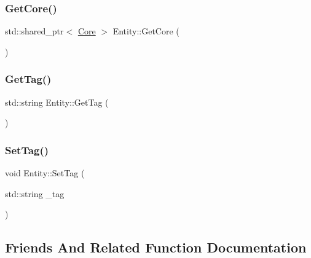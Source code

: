 \mbox{\label{class_entity_aca8a5ff6e980db6f834d841a73dfbf89}} 
\subsubsection{\texorpdfstring{Get\+Core()}{GetCore()}}
{\footnotesize\ttfamily std\+::shared\+\_\+ptr$<$ \mbox{\hyperlink{class_core}{Core}} $>$ Entity\+::\+Get\+Core (\begin{DoxyParamCaption}{ }\end{DoxyParamCaption})}

\mbox{\label{class_entity_a75b54507da9a1178db1f742cc49fcba1}} 
\subsubsection{\texorpdfstring{Get\+Tag()}{GetTag()}}
{\footnotesize\ttfamily std\+::string Entity\+::\+Get\+Tag (\begin{DoxyParamCaption}{ }\end{DoxyParamCaption})\hspace{0.3cm}{\ttfamily [inline]}}

\mbox{\label{class_entity_ac5da9f659ddd64da2c4c18ee6346d320}} 
\subsubsection{\texorpdfstring{Set\+Tag()}{SetTag()}}
{\footnotesize\ttfamily void Entity\+::\+Set\+Tag (\begin{DoxyParamCaption}\item[{std\+::string}]{\+\_\+tag }\end{DoxyParamCaption})\hspace{0.3cm}{\ttfamily [inline]}}



\subsection{Friends And Related Function Documentation}
\mbox{\label{class_entity_a4107254ac74f90d4f91e810d755b98c2}} 
